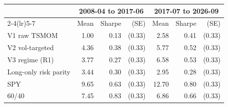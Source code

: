 \begin{tabular}{lrrrrrr}
\toprule
& \multicolumn{3}{c}{2008-04 to 2017-06} & \multicolumn{3}{c}{2017-07 to 2026-09} \\
\cmidrule(lr){2-4}\cmidrule(lr){5-7}
 & Mean & Sharpe & (SE) & Mean & Sharpe & (SE) \\
\midrule
V1 raw TSMOM & 1.00 & 0.13 & (0.33) & 2.58 & 0.41 & (0.33) \\
V2 vol-targeted & 4.36 & 0.38 & (0.33) & 5.77 & 0.52 & (0.33) \\
V3 regime (R1) & 3.77 & 0.27 & (0.33) & 6.58 & 0.53 & (0.33) \\
Long-only risk parity & 3.44 & 0.30 & (0.33) & 2.95 & 0.28 & (0.33) \\
SPY & 9.65 & 0.63 & (0.33) & 12.70 & 0.80 & (0.33) \\
60/40 & 7.45 & 0.83 & (0.33) & 6.86 & 0.66 & (0.33) \\
\bottomrule
\end{tabular}
